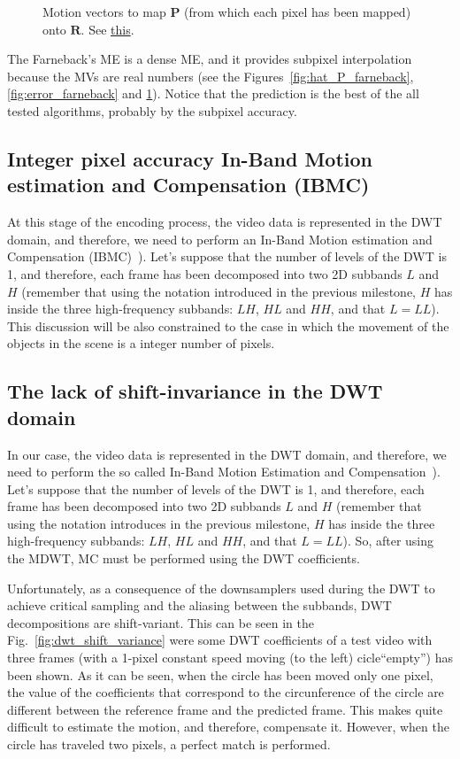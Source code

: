 \begin{figure}
  \centering
  \caption{Motion vectors to map ${\mathbf P}$ (from which each pixel has been mapped) onto ${\mathbf R}$. See \href{https://github.com/Sistemas-Multimedia/Sistemas-Multimedia.github.io/blob/master/milestones/09-ME/farneback_ME.ipynb}{this}.}
  \label{fig:MVs_farneback}
\end{figure}

The Farneback's ME is a dense ME, and it provides subpixel
interpolation because the MVs are real numbers (see the
Figures~\ref{fig:hat_P_farneback}, \ref{fig:error_farneback} and
\ref{fig:MVs_farneback}). Notice that the prediction is the best of
the all tested algorithms, probably by the subpixel accuracy.

\subsection{Integer pixel accuracy In-Band Motion estimation and Compensation (IBMC)}
At this stage of the encoding process, the video data is represented
in the DWT domain, and therefore, we need to perform an In-Band Motion
estimation and Compensation
(IBMC)~\cite{andreopoulos2005complete}). Let's suppose that the number
of levels of the DWT is 1, and therefore, each frame has been
decomposed into two 2D subbands $L$ and $H$ (remember that using the
notation introduced in the previous milestone, $H$ has inside the
three high-frequency subbands: $LH$, $HL$ and $HH$, and that
$L=LL$). This discussion will be also constrained to the case in which
the movement of the objects in the scene is a integer number of
pixels.

\subsection{The lack of shift-invariance in the DWT domain}
In our case, the video data is represented in the DWT domain, and
therefore, we need to perform the so called In-Band Motion Estimation
and Compensation~\cite{andreopoulos2005complete}). Let's suppose that
the number of levels of the DWT is 1, and therefore, each frame has
been decomposed into two 2D subbands $L$ and $H$ (remember that using
the notation introduces in the previous milestone, $H$ has inside the
three high-frequency subbands: $LH$, $HL$ and $HH$, and that
$L=LL$). So, after using the MDWT, MC must be performed using the DWT
coefficients.

Unfortunately, as a consequence of the downsamplers used during the
DWT to achieve critical sampling and the aliasing between the
subbands, DWT decompositions are shift-variant. This can be seen in
the Fig.~\ref{fig:dwt_shift_variance} were some DWT coefficients of a
test video with three frames (with a 1-pixel constant speed moving (to
the left) cicle``empty'') has been shown. As it can be seen, when the
circle has been moved only one pixel, the value of the coefficients
that correspond to the circunference of the circle are different
between the reference frame and the predicted frame. This makes quite
difficult to estimate the motion, and therefore, compensate
it. However, when the circle has traveled two pixels, a perfect match
is performed.

